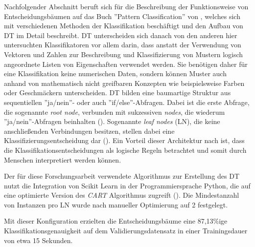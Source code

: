 Nachfolgender Abschnitt beruft sich für die Beschreibung der Funktionsweise von Entscheidungsbäumen auf das Buch ''Pattern Classification'' von \cite{duda2012pattern}, welches sich mit verschiedenen Methoden der Klassifikation beschäftigt und den Aufbau von DT im Detail beschreibt. DT unterscheiden sich danach von den anderen hier untersuchten Klassifikatoren vor allem darin, dass anstatt der Verwendung von Vektoren und Zahlen zur Beschreibung und Klassifizierung von Mustern logisch angeordnete Listen von Eigenschaften verwendet werden. Sie benötigen daher für eine Klassifikation keine numerischen Daten, sondern können Muster auch anhand von mathematisch nicht greifbaren Konzepten wie beispielsweise Farben oder Geschmäckern unterscheiden. DT bilden eine baumartige Struktur aus sequentiellen ''ja/nein''- oder auch ''if/else''-Abfragen. Dabei ist die erste Abfrage, die sogenannte \textit{root node}, verbunden mit sukzessiven \textit{nodes}, die wiederum ''ja/nein''-Abfragen beinhalten (\cite{duda2012pattern}). Sogenannte \textit{leaf nodes} (LN), die keine anschließenden Verbindungen besitzen, stellen dabei eine Klassifizierungsentscheidung dar (\cite{Kaufmann2013}). Ein Vorteil dieser Architektur nach \cite{duda2012pattern} ist, dass die Klassifikationsentscheidungen als logische Regeln betrachtet und somit durch Menschen interpretiert werden können.

Der für diese Forschungsarbeit verwendete Algorithmus zur Erstellung des DT nutzt die Integration von Scikit Learn in der Programmiersprache Python, die auf eine optimierte Version des \textit{CART} Algorithmus zugreift (\cite{scikitDT}). Die Mindestanzahl von Instanzen pro LN wurde nach manueller Optimierung auf 2 festgelegt.

Mit dieser Konfiguration erzielten die Entscheidungsbäume eine 87,13\%ige Klassifikationsgenauigkeit auf dem Validierungsdatensatz in einer Trainingsdauer von etwa 15 Sekunden.